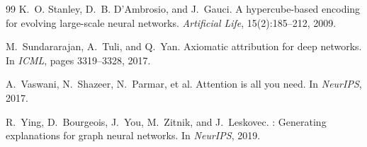 \documentclass[11pt]{article}
\begin{document}
\begin{thebibliography}{99}
K.~O. Stanley, D.~B. D'Ambrosio, and J.~Gauci.
\newblock A hypercube-based encoding for evolving large-scale neural networks.
\newblock \emph{Artificial Life}, 15(2):185--212, 2009.

M.~Sundararajan, A.~Tuli, and Q.~Yan.
\newblock Axiomatic attribution for deep networks.
\newblock In \emph{ICML}, pages 3319--3328, 2017.

A.~Vaswani, N.~Shazeer, N.~Parmar, et al.
\newblock Attention is all you need.
\newblock In \emph{NeurIPS}, 2017.

R.~Ying, D.~Bourgeois, J.~You, M.~Zitnik, and J.~Leskovec.
: Generating explanations for graph neural networks.
\newblock In \emph{NeurIPS}, 2019.

\end{thebibliography}
\end{document}
